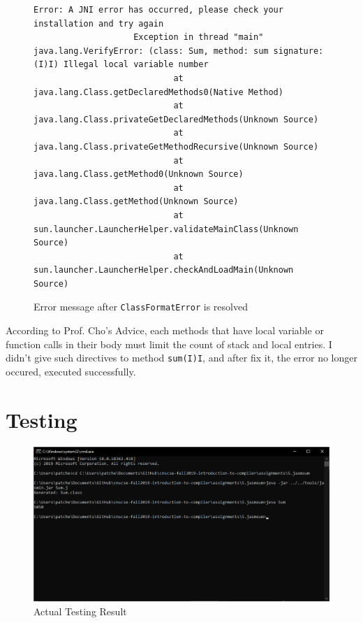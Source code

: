 \documentclass[a4paper, 12pt]{article}
\begin{document}
            \begin{figure}[H]
                \begin{lstlisting}[gobble=20]
                    Error: A JNI error has occurred, please check your installation and try again
                    Exception in thread "main" java.lang.VerifyError: (class: Sum, method: sum signature: (I)I) Illegal local variable number
                            at java.lang.Class.getDeclaredMethods0(Native Method)
                            at java.lang.Class.privateGetDeclaredMethods(Unknown Source)
                            at java.lang.Class.privateGetMethodRecursive(Unknown Source)
                            at java.lang.Class.getMethod0(Unknown Source)
                            at java.lang.Class.getMethod(Unknown Source)
                            at sun.launcher.LauncherHelper.validateMainClass(Unknown Source)
                            at sun.launcher.LauncherHelper.checkAndLoadMain(Unknown Source)
                \end{lstlisting}
        
                \centering        
                \caption{Error message after \texttt{ClassFormatError} is resolved}
            \end{figure}

            According to Prof. Cho's Advice, each methods that have local variable or function calls in their body must limit the count of stack and local entries. I didn't give such directives to method \texttt{sum(I)I}, and after fix it, the error no longer occured, executed successfully.
    \section{Testing}
    \begin{figure}[H]
        \includegraphics[width=\textwidth]{proof}

        \centering        
        \caption{Actual Testing Result}
    \end{figure}
\end{document}
